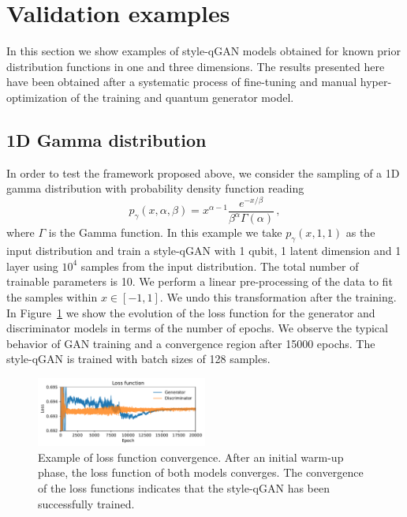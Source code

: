 \documentclass[twocolumn,preprintnumbers,superscriptaddress]{revtex4-2}
\begin{document}
\section{Validation examples}
\label{sec:validation}

In this section we show examples of style-qGAN models obtained for known prior
distribution functions in one and three dimensions. The results presented here
have been obtained after a systematic process of fine-tuning and manual
hyper-optimization of the training and quantum generator model.

\subsection{1D Gamma distribution}
\label{sec:gamma}

In order to test the framework proposed above, we
consider the sampling of a 1D gamma distribution with probability density
function reading
\begin{equation}
  p_\gamma (x, \alpha, \beta) = x^{\alpha-1} \frac{e^{-x/\beta}}{\beta^\alpha \Gamma(\alpha)}\,,
\end{equation}
where $\Gamma$ is the Gamma function. In this example we take $p_\gamma (x, 1,
1)$ as the input distribution and train a style-qGAN with 1 qubit, 1 latent dimension and
1 layer using $10^4$ samples from the input distribution. The total number of trainable parameters is 10. We perform a linear pre-processing of the data to fit the samples within $x \in [-1, 1]$. We undo this transformation after the training.
%
In Figure~\ref{fig:loss} we show the evolution of the loss function for the
generator and discriminator models in terms of the number of epochs. We observe the
typical behavior of GAN training and a convergence region after 15000 epochs.
%
The style-qGAN is trained with batch sizes of 128 samples.

\begin{figure}
  \includegraphics[width=0.5\textwidth]{plots/1Dgamma/1Dgamma_loss.pdf}
  \caption{\label{fig:loss}Example of loss function convergence. After an
  initial warm-up phase, the loss function of both models converges. The convergence of the loss functions indicates that the style-qGAN has been successfully trained.}
\end{figure}
\end{document}
